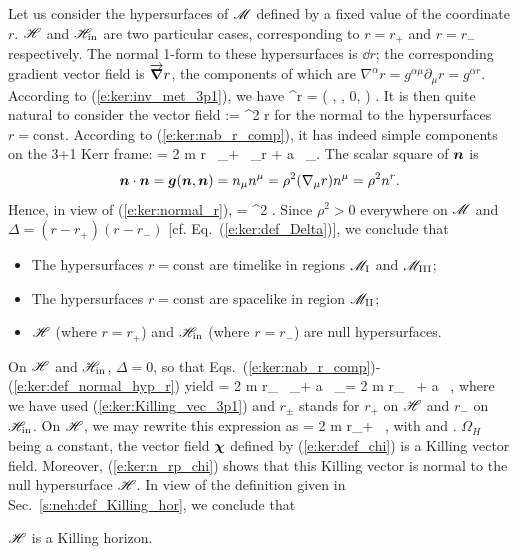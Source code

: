 Let us consider the hypersurfaces of $\mathscr{M}$ defined by a fixed value of
the coordinate $r$. $\mathscr{H}$ and $\mathscr{H}_{\rm in}$ are two particular cases,
corresponding to $r=r_+$ and $r=r_-$ respectively.
The normal 1-form to these hypersurfaces is $\dd r$; the corresponding
gradient vector field is $\overrightarrow{\bm{\nabla}} r$, the components of which are
$\nabla^\alpha r = g^{\alpha\mu} \partial_\mu r = g^{\alpha r}$.
According to (\ref{e:ker:inv_met_3p1}), we have
\be \label{e:ker:nab_r_comp}
    \nabla^\alpha r = \left( , , 0, 
            \right) .
\ee
It is then quite natural to consider the vector field
\be \label{e:ker:def_normal_hyp_r}
     := \rho^2 \vw{\nabla} r
\ee
for the normal to the hypersurfaces $r=\mathrm{const}$. According to (\ref{e:ker:nab_r_comp}),
it has indeed simple components on the 3+1 Kerr frame:
\be \label{e:ker:normal_r}
     = 2 m r \, \wpar_\ti + \Delta \, \wpar_{\tilde r} + a \, \wpar_\tph .
\ee
The scalar square of $\bm{n}$ is
\[
    \bm{n}\cdot\bm{n} = \bm{g}(\bm{n},\bm{n}) = n_\mu n^\mu = \rho^2 (\nabla_\mu r) n^\mu
    = \rho^2 n^r .
\]
Hence, in view of (\ref{e:ker:normal_r}),
\be
    \cdot{} = \rho^2 \Delta .
\ee
Since $\rho^2>0$ everywhere on $\mathscr{M}$ and $\Delta = (r-r_+)(r-r_-)$ [cf. Eq.~(\ref{e:ker:def_Delta})], we conclude that
\begin{greybox}
\begin{itemize}
\item The hypersurfaces $r=\mathrm{const}$ are timelike in regions $\mathscr{M}_{\rm I}$ and $\mathscr{M}_{\rm III}$;
\item The hypersurfaces $r=\mathrm{const}$ are spacelike in region $\mathscr{M}_{\rm II}$;
\item $\mathscr{H}$ (where $r=r_+$) and $\mathscr{H}_{\rm in}$ (where $r=r_-$) are null hypersurfaces.
\end{itemize}
\end{greybox}

On $\mathscr{H}$ and $\mathscr{H}_{\rm in}$, $\Delta=0$, so that
Eqs.~(\ref{e:ker:nab_r_comp})-(\ref{e:ker:def_normal_hyp_r})
yield
\be \label{e:ker:normal_r_Killing}
     = 2 m r_{\pm} \, \wpar_\ti + a \, \wpar_\tph = 2 m r_{\pm} \, \w{\xi}
        + a \, \w{\eta} ,
\ee
where we have used (\ref{e:ker:Killing_vec_3p1}) and $r_{\pm}$ stands for
$r_+$ on $\mathscr{H}$ and $r_-$ on $\mathscr{H}_{\rm in}$.
On $\mathscr{H}$, we may rewrite this expression as
\be \label{e:ker:n_rp_chi}
     = 2 m r_+ \, \w{\chi} ,
\ee
with
\be \label{e:ker:def_chi}
\ee
and
\be \label{e:ker:def_OmegaH}
    .
\ee
$\Omega_H$ being a constant, the vector field $\bm{\chi}$ defined by
(\ref{e:ker:def_chi}) is a Killing vector field. Moreover, (\ref{e:ker:n_rp_chi})
shows that this Killing vector is normal to the null hypersurface $\mathscr{H}$.
In view of the definition given in Sec.~\ref{s:neh:def_Killing_hor}, we
conclude that
\begin{greybox}
$\mathscr{H}$ is a Killing horizon.
\end{greybox}

